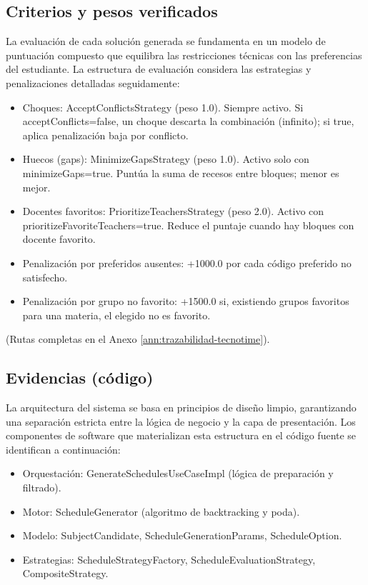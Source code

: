%

\subsection{Criterios y pesos verificados}
La evaluación de cada solución generada se fundamenta en un modelo de puntuación compuesto que equilibra las restricciones técnicas con las preferencias del estudiante. La estructura de evaluación considera las estrategias y penalizaciones detalladas seguidamente:
\begin{itemize}
  \item Choques: AcceptConflictsStrategy (peso 1.0). Siempre activo. Si acceptConflicts=false, un choque descarta la combinación (infinito); si true, aplica penalización baja por conflicto.
  \item Huecos (gaps): MinimizeGapsStrategy (peso 1.0). Activo solo con minimizeGaps=true. Puntúa la suma de recesos entre bloques; menor es mejor.
  \item Docentes favoritos: PrioritizeTeachersStrategy (peso 2.0). Activo con prioritizeFavoriteTeachers=true. Reduce el puntaje cuando hay bloques con docente favorito.
  \item Penalización por preferidos ausentes: +1000.0 por cada código preferido no satisfecho.
  \item Penalización por grupo no favorito: +1500.0 si, existiendo grupos favoritos para una materia, el elegido no es favorito.
\end{itemize}
(Rutas completas en el Anexo \ref{ann:trazabilidad-tecnotime}).


\subsection{Evidencias (código)}
La arquitectura del sistema se basa en principios de diseño limpio, garantizando una separación estricta entre la lógica de negocio y la capa de presentación. Los componentes de software que materializan esta estructura en el código fuente se identifican a continuación:

\begin{itemize}
  \item Orquestación: GenerateSchedulesUseCaseImpl (lógica de preparación y filtrado).
  \item Motor: ScheduleGenerator (algoritmo de backtracking y poda).
  \item Modelo: SubjectCandidate, ScheduleGenerationParams, ScheduleOption.
  \item Estrategias: ScheduleStrategyFactory, ScheduleEvaluationStrategy, CompositeStrategy.
\end{itemize}
